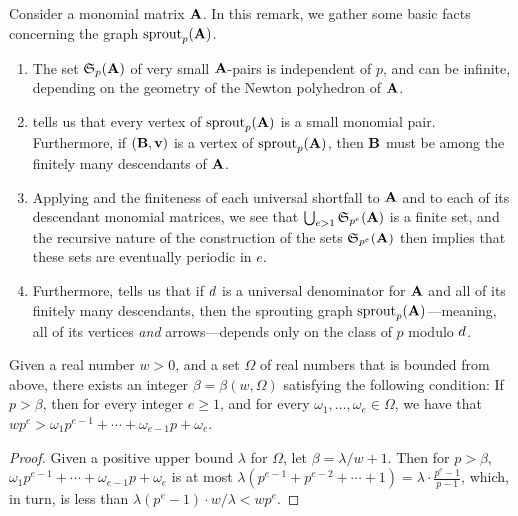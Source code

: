 \documentclass{amsart}
\begin{document}
\begin{remark}
   \label{elementary1: R}
   Consider a monomial matrix $\mathbf{A}$.
   In this remark, we gather some basic facts concerning the graph $\operatorname{sprout}_p(\mathbf{A})$.
\begin{enumerate}
\item The set $\mathfrak{S}_p(\mathbf{A})$ of very small $\mathbf{A}$-pairs is independent of $p$, and can be infinite, depending on the geometry of the Newton polyhedron of $\mathbf{A}$.

\item \label{elementary1 small pairs}  tells us that every vertex of $\operatorname{sprout}_p(\mathbf{A})$ is a small monomial pair.  Furthermore, if $(\mathbf{B},\mathbf{v})$ is a vertex of $\operatorname{sprout}_p(\mathbf{A})$, then $\mathbf{B}$ must be among the finitely many descendants of $\mathbf{A}$.

\item \label{elementary1 periodic in e} Applying  and the finiteness of each universal shortfall to $\mathbf{A}$ and to each of its descendant monomial matrices, we see that $\bigcup_{e>1} \mathfrak{S}_{p^e}(\mathbf{A})$ is a finite set, and the recursive nature of the construction of the sets $\mathfrak{S}_{p^e}(\mathbf{A})$ then implies that these sets are eventually periodic in $e$.

\item \label{elementary1 periodic in p} Furthermore,  tells us that if $d$ is a universal denominator for $\mathbf{A}$ and all of its finitely many descendants, then the sprouting graph  $\operatorname{sprout}_p(\mathbf{A})$---meaning, all of its vertices \emph{and} arrows---depends only on the class of $p$ modulo $d$.
\end{enumerate}
\end{remark}

\begin{lemma}
   \label{positive-polynomial: L}
   Given a real number $w > 0$, and a set $\Omega$ of real numbers that is bounded from above, there exists an integer $\beta = \beta(w, \Omega)$ satisfying the following condition\textup:
   If $p > \beta$, then for every integer $e \geq 1$, and for every $\omega_1, \ldots, \omega_e \in \Omega$, we have that $wp^{e} >  \omega_1 p^{e-1} + \cdots + \omega_{e-1} p + \omega_e$.
\end{lemma}

\begin{proof}
   Given a positive upper bound $\lambda$ for $\Omega$, let $\beta = \lambda/w  + 1$.
   Then for $p>\beta$, $\omega_1 p^{e-1} + \cdots + \omega_{e-1}  p + \omega_e$ is at most $\lambda(p^{e-1} + p^{e-2} + \cdots + 1) = \lambda \cdot \frac{p^e-1}{p-1}$, which, in turn, is less than $\lambda (p^e-1) \cdot w/\lambda < w p^e$.
\end{proof}
\end{document}

